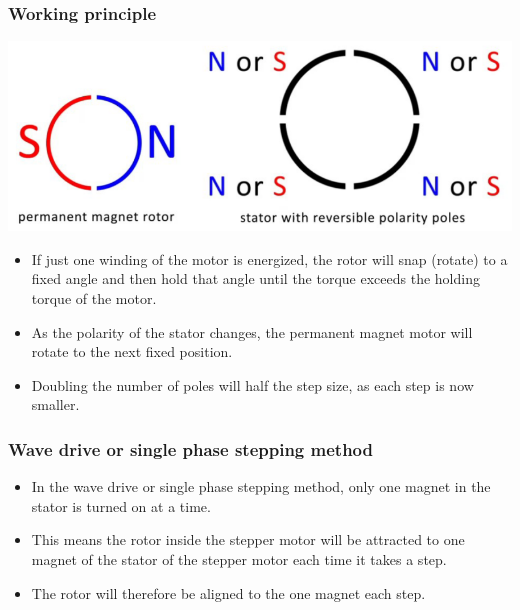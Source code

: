 \documentclass[11pt]{article}
\begin{document}
 \newpage

\subsubsection{Working principle}
\label{sec:org9b6d652}
\begin{center}
\includegraphics[width=.9\linewidth]{./images/stepper-motor-working-principle-diagram.png}
\end{center}
\begin{itemize}
\item If just one winding of the motor is energized, the rotor will snap (rotate) to a fixed angle and then hold that angle until the torque exceeds the holding torque of the motor.
\item As the polarity of the stator changes, the permanent magnet motor will rotate to the next fixed position.
\item Doubling the number of poles will half the step size, as each step is now smaller.
\end{itemize}

\subsubsection{Wave drive or single phase stepping method}
\label{sec:org91ff411}
\begin{itemize}
\item In the wave drive or single phase stepping method, only one magnet in the stator is turned on at a time.
\item This means the rotor inside the stepper motor will be attracted to one magnet of the stator of the stepper motor each time it takes a step.
\item The rotor will therefore be aligned to the one magnet each step.
\end{itemize}

 \newpage
\end{document}
